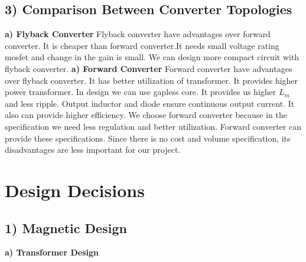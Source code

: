 \documentclass{article}
\newcommand\tab[1][1cm]{\hspace*{#1}}
\begin{document}
 


\subsection*{3) Comparison Between Converter Topologies}

\tab\textbf{a) Flyback Converter} 
\newline
\newline
\tab Flyback converter have advantages over forward converter. It is cheaper than forward converter.It needs small voltage rating mosfet and change in the gain is small. We can design more compact circuit with flyback converter.
\newline
\newline
\tab\textbf{a) Forward Converter} 
\newline
\newline
\tab Forward converter have advantages over flyback converter. It has better utilization of transformer. It provides higher power transformer. In design we can use gapless core. It provides us higher $L_m$ and less ripple. Output inductor and diode ensure continuous output current. It also  can provide higher efficiency. 
\newline
\newline
\tab We choose forward converter because in the specification we need less regulation and better utilization. Forward converter can provide these specifications. Since there is no cost and volume specification, its disadvantages are less important for our project. 

\newpage
\section*{Design Decisions}
\subsection*{1) Magnetic Design}
\tab\textbf{a) Transformer Design}
\end{document}

